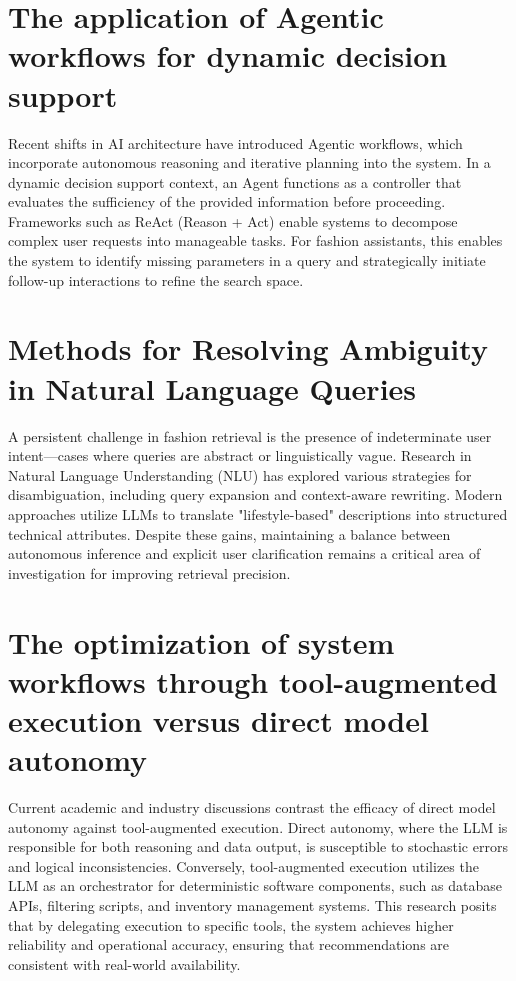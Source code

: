 \section{The application of Agentic workflows for dynamic decision support}

Recent shifts in AI architecture have introduced Agentic workflows, which incorporate autonomous reasoning and iterative planning into the system. In a dynamic decision support context, an Agent functions as a controller that evaluates the sufficiency of the provided information before proceeding. Frameworks such as ReAct (Reason + Act) enable systems to decompose complex user requests into manageable tasks. For fashion assistants, this enables the system to identify missing parameters in a query and strategically initiate follow-up interactions to refine the search space.

\section{Methods for Resolving Ambiguity in Natural Language Queries}

A persistent challenge in fashion retrieval is the presence of indeterminate user intent—cases where queries are abstract or linguistically vague. Research in Natural Language Understanding (NLU) has explored various strategies for disambiguation, including query expansion and context-aware rewriting. Modern approaches utilize LLMs to translate "lifestyle-based" descriptions into structured technical attributes. Despite these gains, maintaining a balance between autonomous inference and explicit user clarification remains a critical area of investigation for improving retrieval precision.

\section{The optimization of system workflows through tool-augmented execution versus direct model autonomy}

Current academic and industry discussions contrast the efficacy of direct model autonomy against tool-augmented execution. Direct autonomy, where the LLM is responsible for both reasoning and data output, is susceptible to stochastic errors and logical inconsistencies. Conversely, tool-augmented execution utilizes the LLM as an orchestrator for deterministic software components, such as database APIs, filtering scripts, and inventory management systems. This research posits that by delegating execution to specific tools, the system achieves higher reliability and operational accuracy, ensuring that recommendations are consistent with real-world availability.

